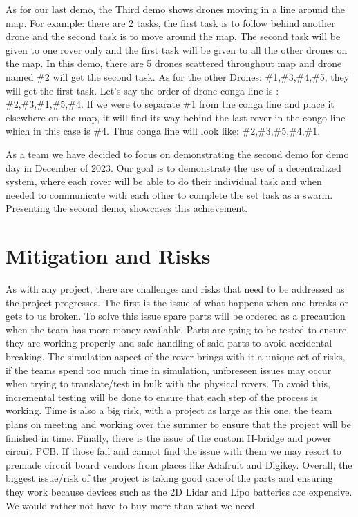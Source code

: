 \documentclass[conference]{IEEEtran}
\begin{document}
As for our last demo, the Third demo shows drones moving in a line around the map. For example: there are 2 tasks, the first task is to follow behind another drone and the second task is to move around the map. The second task will be given to one rover only and the first task will be given to all the other drones on the map. In this demo, there are 5 drones scattered throughout map and drone named \#2 will get the second task. As for the other Drones: \#1,\#3,\#4,\#5, they will get the first task. Let’s say the order of drone conga line is : \#2,\#3,\#1,\#5,\#4. If we were to separate \#1 from the conga line and place it elsewhere on the map, it will find its way behind the last rover in the congo line which in this case is \#4. Thus conga line will look like: \#2,\#3,\#5,\#4,\#1.

As a team we have decided to focus on demonstrating the second demo for demo day in December of 2023. Our goal is to demonstrate the use of a decentralized system, where each rover will be able to do their individual task and when needed to communicate with each other to complete the set task as a swarm. Presenting the second demo, showcases this achievement.

\section{Mitigation and Risks}
As with any project, there are challenges and risks that need to be addressed as the project progresses. The first is the issue of what happens when one breaks or gets to us broken. To solve this issue spare parts will be ordered as a precaution when the team has more money available. Parts are going to be tested to ensure they are working properly and safe handling of said parts to avoid accidental breaking. The simulation aspect of the rover brings with it a unique set of risks, if the teams spend too much time in simulation, unforeseen issues may occur when trying to translate/test in bulk with the physical rovers. To avoid this, incremental testing will be done to ensure that each step of the process is working. Time is also a big risk, with a project as large as this one, the team plans on meeting and working over the summer to ensure that the project will be finished in time. Finally, there is the issue of the custom H-bridge and power circuit PCB. If those fail and cannot find the issue with them we may resort to premade circuit board vendors from places like Adafruit and Digikey. Overall, the biggest issue/risk of the project is taking good care of the parts and ensuring they work because devices such as the 2D Lidar and Lipo batteries are expensive. We would rather not have to buy more than what we need.
\end{document}
